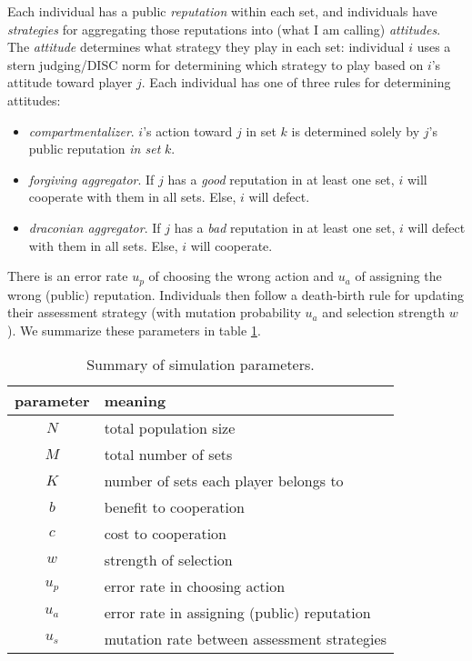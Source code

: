 \documentclass[13pt]{amsart}
\begin{document}
Each individual has a public \emph{reputation} within each set, and individuals have \emph{strategies} for aggregating those reputations into (what I am calling) \emph{attitudes}.
The \emph{attitude} determines what strategy they play in each set: individual $i$ uses a stern judging/DISC norm for determining which strategy to play based on $i$'s attitude toward player $j$.
Each individual has one of three rules for determining attitudes:
\begin{itemize}
    \item \emph{compartmentalizer}.
    $i$'s action toward $j$ in set $k$ is determined solely by $j$'s public reputation \emph{in set} $k$.
    \item \emph{forgiving aggregator}.
    If $j$ has a \emph{good} reputation in at least one set, $i$ will cooperate with them in all sets.
    Else, $i$ will defect.
    \item \emph{draconian aggregator}.
    If $j$ has a \emph{bad} reputation in at least one set, $i$ will defect with them in all sets.
    Else, $i$ will cooperate.
\end{itemize}
There is an error rate $u_p$ of choosing the wrong action and $u_a$ of assigning the wrong (public) reputation.
Individuals then follow a death-birth rule for updating their assessment strategy (with mutation probability $u_a$ and selection strength $w$).
We summarize these parameters in table \ref{tab:param_table}.
\begin{center}
    \begin{table}[h]
        \begin{tabular}{| c | l |}
        \hline
        parameter & meaning \\
        \hline
         $N$ & total population size \\
         $M$ & total number of sets \\
         $K$ & number of sets each player belongs to \\
         $b$ & benefit to cooperation \\
         $c$ & cost to cooperation \\
         $w$ & strength of selection \\
         $u_p$ & error rate in choosing action \\
         $u_a$ & error rate in assigning (public) reputation \\
         $u_s$ & mutation rate between assessment strategies \\
         \hline
        \end{tabular}
        \caption{Summary of simulation parameters.}
    \label{tab:param_table}
    \end{table}
\end{center}
\end{document}
